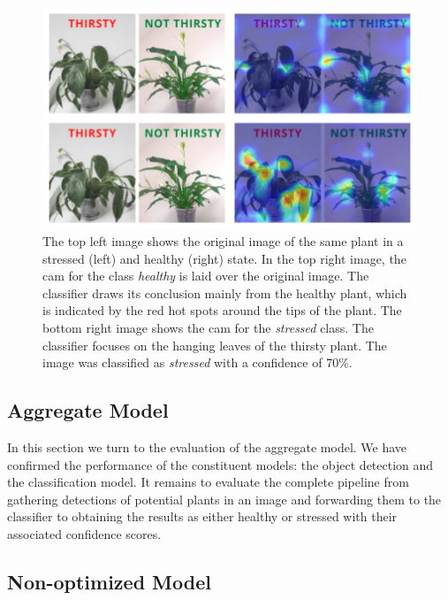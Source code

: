 \documentclass[draft,final]{vutinfth} %
\begin{document}
\begin{figure}
  \centering
  \includegraphics{graphics/classifier-cam.pdf}
  \caption[Classifier \glspl{cam}.]{The top left image shows the
    original image of the same plant in a stressed (left) and healthy
    (right) state. In the top right image, the \gls{cam} for the class
    \emph{healthy} is laid over the original image. The classifier
    draws its conclusion mainly from the healthy plant, which is
    indicated by the red hot spots around the tips of the plant. The
    bottom right image shows the \gls{cam} for the \emph{stressed}
    class. The classifier focuses on the hanging leaves of the thirsty
    plant. The image was classified as \emph{stressed} with a
    confidence of 70\%.}
  \label{fig:classifier-cam}
\end{figure}

\subsection{Aggregate Model}
\label{ssec:aggregate-model}

In this section we turn to the evaluation of the aggregate model. We
have confirmed the performance of the constituent models: the object
detection and the classification model. It remains to evaluate the
complete pipeline from gathering detections of potential plants in an
image and forwarding them to the classifier to obtaining the results
as either healthy or stressed with their associated confidence scores.

\subsection{Non-optimized Model}
\label{ssec:model-non-optimized}
\end{document}
